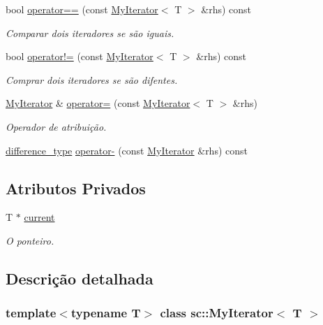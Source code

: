 \begin{DoxyCompactItemize}
bool \hyperlink{classsc_1_1MyIterator_afde62290f677ab0c46f739008e7ed111}{operator==} (const \hyperlink{classsc_1_1MyIterator}{My\+Iterator}$<$ T $>$ \&rhs) const
\begin{DoxyCompactList}\small\item\em Comparar dois iteradores se são iguais. \end{DoxyCompactList}\item 
bool \hyperlink{classsc_1_1MyIterator_a6a64ad5515a5111089f73871a140e48c}{operator!=} (const \hyperlink{classsc_1_1MyIterator}{My\+Iterator}$<$ T $>$ \&rhs) const
\begin{DoxyCompactList}\small\item\em Comprar dois iteradores se são difentes. \end{DoxyCompactList}\item 
\hyperlink{classsc_1_1MyIterator}{My\+Iterator} \& \hyperlink{classsc_1_1MyIterator_af36f2a583da36cbd26ea491a09810e42}{operator=} (const \hyperlink{classsc_1_1MyIterator}{My\+Iterator}$<$ T $>$ \&rhs)
\begin{DoxyCompactList}\small\item\em Operador de atribuição. \end{DoxyCompactList}\item 
\hyperlink{classsc_1_1MyIterator_ab37e30d9d7abaca8b7ed9c4ba7371798}{difference\+\_\+type} \hyperlink{classsc_1_1MyIterator_a52b15847aa07311fb00a27cff3cbfca2}{operator-\/} (const \hyperlink{classsc_1_1MyIterator}{My\+Iterator} \&rhs) const
\end{DoxyCompactItemize}
\subsection*{Atributos Privados}
\begin{DoxyCompactItemize}
\item 
T $\ast$ \hyperlink{classsc_1_1MyIterator_a33cc25bbe4f629ffff6f8b85b268f1f1}{current}
\begin{DoxyCompactList}\small\item\em O ponteiro. \end{DoxyCompactList}\end{DoxyCompactItemize}


\subsection{Descrição detalhada}
\subsubsection*{template$<$typename T$>$\newline
class sc\+::\+My\+Iterator$<$ T $>$}

